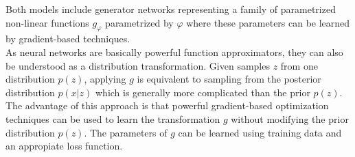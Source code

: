 
  Both models include generator networks representing a family of parametrized non-linear functions $g_\varphi$ parametrized by $\varphi$ where these parameters can be learned by gradient-based techniques.\\
    As neural networks are basically powerful function approximators, they can also be understood as a distribution transformation.
    Given samples $z$ from one distribution $p(z)$, applying $g$ is equivalent to sampling from the posterior distribution $p(x|z)$ which is generally more complicated than the prior $p(z)$.\\


    The advantage of this approach is that powerful gradient-based optimization techniques can be used to learn the transformation $g$ without modifying the prior distribution $p(z)$.
    The parameters of $g$ can be learned using training data and an appropiate loss function.\\
      \newpage



